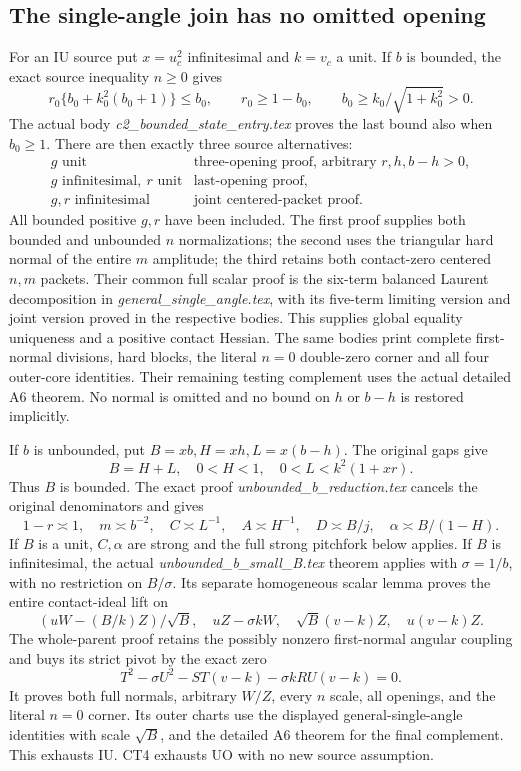 \subsection{The single-angle join has no omitted opening}

For an IU source put \(x=u_c^2\) infinitesimal and
\(k=v_c\) a unit.  If \(b\) is bounded, the exact source
inequality \(n\geq0\) gives
\[
 r_0\{b_0+k_0^2(b_0+1)\}\leq b_0,\qquad
 r_0\geq1-b_0,\qquad
 b_0\geq k_0/\sqrt{1+k_0^2}>0 .                       \tag{CT10}
\]
The actual body \emph{c2\_bounded\_state\_entry.tex} proves
the last bound also when \(b_0\geq1\).
There are then exactly three source alternatives:
\[
\begin{array}{c|l}
g\text{ unit}&\text{three-opening proof, arbitrary }r,h,b-h>0,\\
g\text{ infinitesimal},\ r\text{ unit}
             &\text{last-opening proof},\\
g,r\text{ infinitesimal}
             &\text{joint centered-packet proof}.
\end{array}\tag{CT11}
\]
All bounded positive \(g,r\) have been included.
The first proof supplies both bounded and unbounded \(n\)
normalizations; the second uses the triangular hard normal of
the entire \(m\) amplitude; the third retains both contact-zero
centered \(n,m\) packets.  Their common full scalar proof is the
six-term balanced Laurent decomposition in
\emph{general\_single\_angle.tex}, with its five-term limiting
version and joint version proved in the respective bodies.
This supplies global equality uniqueness and a positive contact
Hessian.  The same bodies print complete first-normal divisions,
hard blocks, the literal \(n=0\) double-zero corner and all four
outer-core identities.  Their remaining testing complement uses
the actual detailed A6 theorem.  No normal is omitted and no
bound on \(h\) or \(b-h\) is restored implicitly.

If \(b\) is unbounded, put \(B=xb,H=xh,L=x(b-h)\).
The original gaps give
\[
 B=H+L,\quad 0<H<1,\quad 0<L<k^2(1+xr).
\]
Thus \(B\) is bounded.  The exact proof
\emph{unbounded\_b\_reduction.tex} cancels the original
denominators and gives
\[
 1-r\asymp1,\quad m\asymp b^{-2},\quad
 C\asymp L^{-1},\quad A\asymp H^{-1},\quad
 D\asymp B/j,\quad \alpha\asymp B/(1-H).               \tag{CT12}
\]
If \(B\) is a unit, \(C,\alpha\) are strong and the full strong
pitchfork below applies.  If \(B\) is infinitesimal, the actual
\emph{unbounded\_b\_small\_B.tex} theorem applies with
\(\sigma=1/b\), with no restriction on \(B/\sigma\).
Its separate homogeneous scalar lemma proves the entire
contact-ideal lift on
\[
 (uW-(B/k)Z)/\sqrt B,\quad uZ-\sigma kW,\quad
 \sqrt B(v-k)Z,\quad u(v-k)Z .
\tag{CT13}
\]
The whole-parent proof retains the possibly nonzero first-normal
angular coupling and buys its strict pivot by the exact zero
\[
 T^2-\sigma U^2-ST(v-k)-\sigma kRU(v-k)=0 .
\]
It proves both full normals, arbitrary \(W/Z\), every \(n\) scale,
all openings, and the literal \(n=0\) corner.  Its outer charts
use the displayed general-single-angle identities with scale
\(\sqrt B\), and the detailed A6 theorem for the final complement.
This exhausts IU.  CT4 exhausts UO with no new source assumption.

